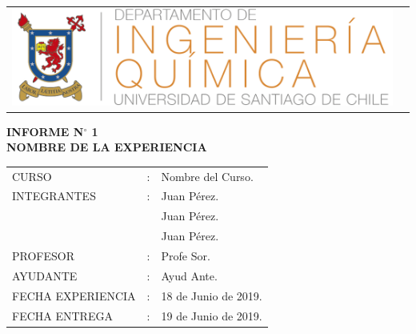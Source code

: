 \begin{titlepage}
\begin{flushleft}
    \begin{tabular}{ll} %
      \multirow{4}{2cm}{\includegraphics[height=0.1\textheight]{imagenes/logo_quimica_trans.png} }
    \end{tabular}
\end{flushleft}

\vspace*{\fill}%
\begin{center}
\textbf{INFORME N$\bm{^{\circ}}$ 1}\\ %
\textbf{NOMBRE DE LA EXPERIENCIA} 
\end{center}
\vspace*{\fill}%

\begin{flushright}
   \begin{tabular}{lll}
   CURSO       &:& Nombre del Curso.\\
   INTEGRANTES &:& Juan Pérez.\\
               & & Juan Pérez.\\
               & & Juan Pérez.\\
   PROFESOR    &:& Profe Sor.\\
   AYUDANTE    &:& Ayud Ante.\\
   FECHA EXPERIENCIA &:& 18 de Junio de 2019.\\
   FECHA ENTREGA     &:& 19 de Junio de 2019.\\
   \end{tabular}
\end{flushright}
\end{titlepage}
